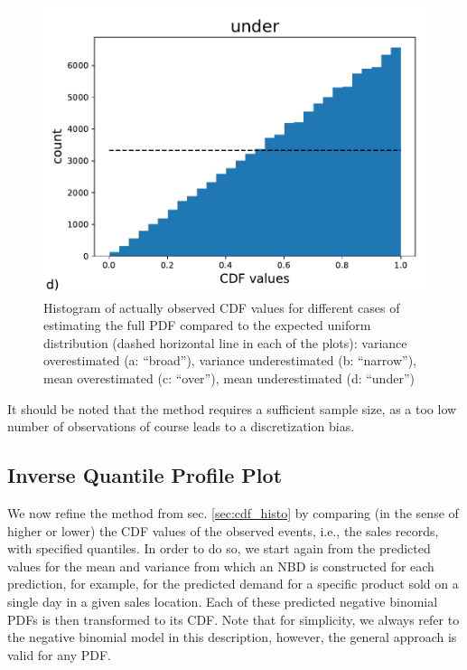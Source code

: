 \documentclass[BCOR=1mm, DIV=calc,10pt,
twoside=true,
twocolumn,
headings=normal]{scrartcl}
\begin{document}
\begin{figure}
\begin{center}
\includegraphics[scale=0.25]{cdf_truth_under}
\caption{\label{fig:cdf_histos} Histogram of actually observed CDF values for different cases of estimating the full PDF compared to the expected uniform distribution (dashed horizontal line in each of the plots): variance overestimated (a: ``broad''), variance underestimated (b: ``narrow''), mean overestimated (c: ``over''), mean underestimated (d: ``under'')}
\end{center}
\end{figure}

It should be noted that the method requires a sufficient sample size, as a too low number of observations of course leads to a discretization bias.

\subsection{Inverse Quantile Profile Plot}
\label{sec:invquant_plot}

We now refine the method from sec. \ref{sec:cdf_histo} by comparing (in the sense of higher or lower) the CDF values of the observed events, i.e., the sales records, with specified quantiles. In order to do so, we start again from the predicted values for the mean and variance from which an NBD is constructed for each prediction, for example, for the predicted demand for a specific product sold on a single day in a given sales location. Each of these predicted negative binomial PDFs is then transformed to its CDF. Note that for simplicity, we always refer to the negative binomial model in this description, however, the general approach is valid for any PDF.
\end{document}

